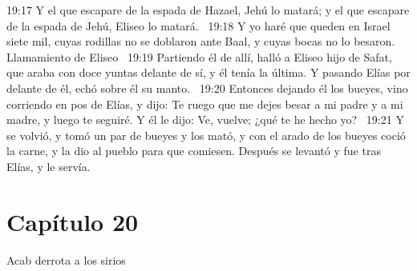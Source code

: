 19:17 Y el que escapare de la espada de Hazael, Jehú lo matará; y el que escapare de la espada de Jehú, Eliseo lo matará.  
19:18 Y yo haré que queden en Israel siete mil, cuyas rodillas no se doblaron ante Baal, y cuyas bocas no lo besaron.  
Llamamiento de Eliseo  
19:19 Partiendo él de allí, halló a Eliseo hijo de Safat, que araba con doce yuntas delante de sí, y él tenía la última. Y pasando Elías por delante de él, echó sobre él su manto.  
19:20 Entonces dejando él los bueyes, vino corriendo en pos de Elías, y dijo: Te ruego que me dejes besar a mi padre y a mi madre, y luego te seguiré. Y él le dijo: Ve, vuelve; ¿qué te he hecho yo?  
19:21 Y se volvió, y tomó un par de bueyes y los mató, y con el arado de los bueyes coció la carne, y la dio al pueblo para que comiesen. Después se levantó y fue tras Elías, y le servía.  
\section*{Capítulo 20}
Acab derrota a los sirios 

